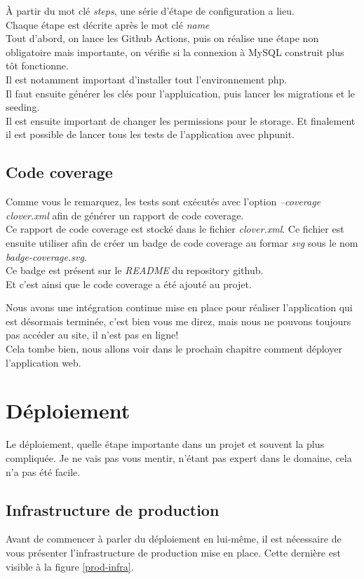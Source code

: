 \documentclass[
    iai, %
    il, %
]{heig-tb}
\begin{document}
À partir du mot clé \emph{steps}, une série d'étape de configuration a lieu.\\
Chaque étape est décrite après le mot clé \emph{name}\\
Tout d'abord, on lance les Github Actions, puis on réalise une étape non obligatoire mais
importante, on vérifie si la connexion à MySQL construit plus tôt fonctionne.\\
Il est notamment important d'installer tout l'environnement php.\\
Il faut ensuite générer les clés pour l'appluication, puis lancer les migrations et le
seeding.\\
Il est ensuite important de changer les permissions pour le storage. Et finalement il est possible
de lancer tous les tests de l'application avec phpunit. \\

\section{Code coverage}
Comme vous le remarquez, les tests sont exécutés avec l'option \emph{--coverage clover.xml} afin de générer un rapport de code coverage. \\
Ce rapport de code coverage est stocké dans le fichier \emph{clover.xml}. Ce fichier est ensuite utiliser afin de créer un badge de code coverage au formar \emph{svg} sous le nom \emph{badge-coverage.svg}. \\
Ce badge est présent sur le \emph{README} du \Gls{repository} \Gls{github}. \\
Et c'est ainsi que le code coverage a été ajouté au projet.

Nous avons une intégration continue mise en place pour réaliser l'application qui est désormais terminée, c'est bien vous me direz, mais nous ne pouvons toujours pas accéder au site, il n'est pas en ligne! \\
Cela tombe bien, nous allons voir dans le prochain chapitre comment déployer l'application web.

\chapter{Déploiement}
Le déploiement, quelle étape importante dans un projet et souvent la plus compliquée.
Je ne vais pas vous mentir, n'étant pas expert dans le domaine, cela n'a pas été facile.

\section{Infrastructure de production}
Avant de commencer à parler du déploiement en lui-même, il est nécessaire de vous présenter l'infrastructure de production mise en place. Cette dernière est visible à la figure \ref{prod-infra}.
\end{document}
